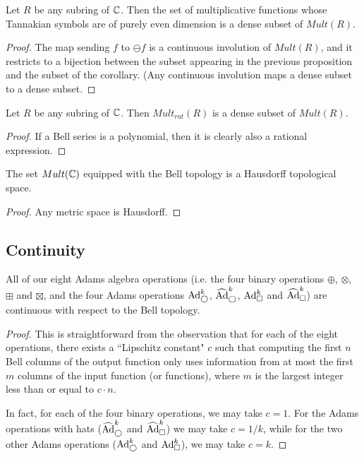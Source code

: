 \begin{corollary}
Let $R$ be any subring of $\mathbb{C}$. Then the set of multiplicative functions whose Tannakian symbols are of purely even dimension is a dense subset of $Mult(R)$. 
\end{corollary}

\begin{proof}
The map sending $f$ to $\ominus f$ is a continuous involution of $Mult(R)$, and it restricts to a bijection between the subset appearing in the previous proposition and the subset of the corollary. (Any continuous involution maps a dense subset to a dense subset.
\end{proof}

\begin{corollary}
Let $R$ be any subring of $\mathbb{C}$. Then $Mult_{rat}(R)$ is a dense subset of $Mult(R)$. 
\end{corollary}

\begin{proof}
If a Bell series is a polynomial, then it is clearly also a rational expression.
\end{proof}

\begin{lemma}
The set $Mult(\mathbb{C})$ equipped with the Bell topology is a Hausdorff topological space.
\end{lemma}
\begin{proof}
Any metric space is Hausdorff.
\end{proof}

\subsection{Continuity}


\begin{theorem} \label{AdamsAlgebraContinuity}
All of our eight Adams algebra operations (i.e. the four binary operations $\oplus$, $\otimes$, $\boxplus$ and $\boxtimes$, and the four Adams operations $\text{Ad}^{k}_{\bigcirc}$, $\widehat{\text{Ad}}^{k}_{\bigcirc}$, $\text{Ad}^{k}_{\square}$ and $\widehat{\text{Ad}}^{k}_{\square}$) are continuous with respect to the Bell topology.
\end{theorem}
\begin{proof}
This is straightforward from the observation that for each of the eight operations, there exists a ``Lipschitz constant" $c$ such that computing the first $n$ Bell columns of the output function only uses information from at most the first $m$ columns of the input function (or functions), where $m$ is the largest integer less than or equal to $c \cdot n$. 

In fact, for each of the four binary operations, we may take $c=1$. For the Adams operations with hats ($\widehat{\text{Ad}}^{k}_{\bigcirc}$ and $\widehat{\text{Ad}}^{k}_{\square}$) we may take $c= 1/k$, while for the two other Adams operations ($\text{Ad}^{k}_{\bigcirc}$ and $\text{Ad}^{k}_{\square}$), we may take $c=k$.
\end{proof}



